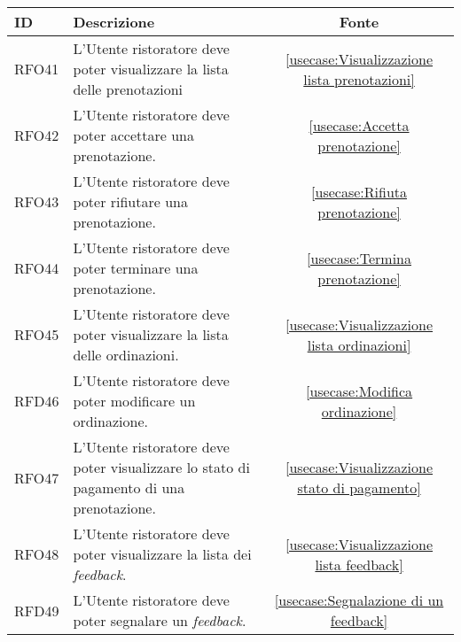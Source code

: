 \begin{table}[H]
	\renewcommand{\arraystretch}{1.5}
	\centering
	\begin{tabularx}{\textwidth}{l|X|c}
		\textbf{ID} & \textbf{Descrizione}                                                                                                    & \textbf{Fonte}                                                       \\
		\hline
		RFO41       & L'Utente ristoratore deve poter visualizzare la lista delle prenotazioni												  & \autoref{usecase:Visualizzazione lista prenotazioni}                 \\
		\hline
		RFO42       & L'Utente ristoratore deve poter accettare una prenotazione.                                                             & \autoref{usecase:Accetta prenotazione}                               \\
		\hline
		RFO43       & L'Utente ristoratore deve poter rifiutare una prenotazione.                                                             & \autoref{usecase:Rifiuta prenotazione}                               \\
		\hline
		RFO44       & L'Utente ristoratore deve poter terminare una prenotazione.                                                             & \autoref{usecase:Termina prenotazione}                               \\
		\hline
		RFO45       & L'Utente ristoratore deve poter visualizzare la lista delle ordinazioni.                                                & \autoref{usecase:Visualizzazione lista ordinazioni}                  \\
		\hline
		RFD46       & L'Utente ristoratore deve poter modificare un ordinazione.                                                              & \autoref{usecase:Modifica ordinazione}                               \\
		\hline
		RFO47       & L'Utente ristoratore deve poter visualizzare lo stato di pagamento di una prenotazione.                                 & \autoref{usecase:Visualizzazione stato di pagamento}                 \\
		\hline
		RFO48       & L'Utente ristoratore deve poter visualizzare la lista dei \textit{feedback}.                                            & \autoref{usecase:Visualizzazione lista feedback}                     \\
		\hline
		RFD49       & L'Utente ristoratore deve poter segnalare un \textit{feedback}.                                                         & \autoref{usecase:Segnalazione di un feedback}                        \\

\end{tabularx}
\end{table}
